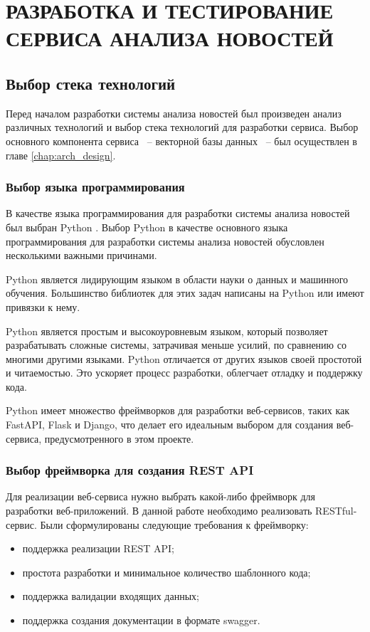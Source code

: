\chapter{РАЗРАБОТКА И ТЕСТИРОВАНИЕ СЕРВИСА АНАЛИЗА НОВОСТЕЙ}
\aftertitle

\section{Выбор стека технологий}

Перед началом разработки системы анализа новостей был произведен анализ различных технологий и выбор стека технологий для разработки сервиса. Выбор основного компонента сервиса ~-- векторной базы данных ~-- был осуществлен в главе \ref{chap:arch_design}.

\subsection{Выбор языка программирования}

В качестве языка программирования для разработки системы анализа новостей был выбран Python \cite{python}. Выбор Python в качестве основного языка программирования для разработки системы анализа новостей обусловлен несколькими важными причинами.

Python является лидирующим языком в области науки о данных и машинного обучения. Большинство библиотек для этих задач написаны на Python или имеют привязки к нему.

Python является простым и высокоуровневым языком, который позволяет разрабатывать сложные системы, затрачивая меньше усилий, по сравнению со многими другими языками. Python отличается от других языков своей простотой и читаемостью. Это ускоряет процесс разработки, облегчает отладку и поддержку кода.

Python имеет множество фреймворков для разработки веб-сервисов, таких как FastAPI, Flask и Django, что делает его идеальным выбором для создания веб-сервиса, предусмотренного в этом проекте.

\subsection{Выбор фреймворка для создания REST API}

Для реализации веб-сервиса нужно выбрать какой-либо фреймворк для разработки веб-приложений. В данной работе необходимо реализовать RESTful-сервис. Были сформулированы следующие требования к фреймворку:
\begin{itemize}
    \item поддержка реализации REST API;
    \item простота разработки и минимальное количество шаблонного кода;
    \item поддержка валидации входящих данных;
    \item поддержка создания документации в формате swagger.
\end{itemize}


